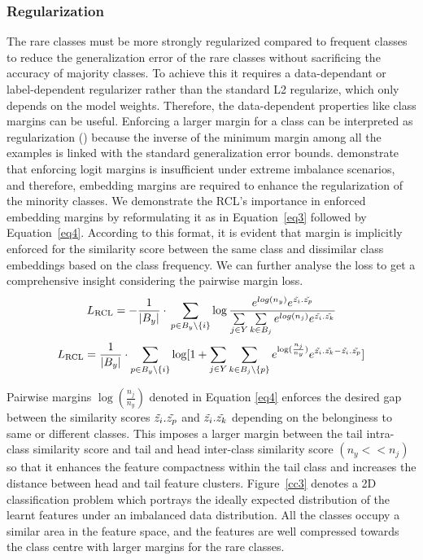 \subsubsection{Regularization}
The rare classes must be more strongly regularized compared to frequent classes to reduce the generalization error of the rare classes without sacrificing the accuracy of majority classes. To achieve this it requires a data-dependant or label-dependent regularizer rather than the standard L2 regularize, which only depends on the model weights. Therefore, the data-dependent properties like class margins can be useful.  Enforcing a larger margin for a class can be interpreted as regularization (\cite{cao2019learning}) because the inverse of the minimum margin among all the examples is linked with the standard generalization error bounds. \cite{elm} demonstrate that enforcing logit margins is insufficient under extreme imbalance scenarios, and therefore, embedding margins are required to enhance the regularization of the minority classes. We demonstrate the RCL's importance in enforced embedding margins by reformulating it as in Equation~\ref{eq3} followed by Equation~\ref{eq4}. According to this format, it is evident that margin is implicitly enforced for the similarity score between the same class and dissimilar class embeddings based on the class frequency. We can further analyse the loss to get a comprehensive insight considering the pairwise margin loss.
\begin{equation}
L_{\text{RCL}}=-\frac{1}{|B_y|} \cdot \\ \sum\limits_{p\in {B_y \text{\textbackslash} \{i\}} }\log \frac{e^{log(n_y)}e^{\Tilde{z_i}.\Tilde{z_p}}}{\sum\limits_{j\in Y} \sum\limits_{k \in B_j } e^{log(n_j)}e^{\Tilde{z_i}.\Tilde{z_k}}}
\label{eq3}
\end{equation}
\begin{equation}
L_{\text{RCL}}=\frac{1}{|B_y|} \cdot  \sum\limits_{p\in {B_y \text{\textbackslash}\{i\}} }\log[1+ \sum\limits_{j\in Y} \sum\limits_{k \in B_j \text{\textbackslash} \{p\}}e^{\log (\frac{n_j}{n_y})}e^{\Tilde{z_i}.\Tilde{z_k} -\Tilde{z_i}.\Tilde{z_p}}]
\label{eq4}
\end{equation}

Pairwise margins $\log(\frac{n_j}{n_y})$ denoted in Equation \ref{eq4} enforces the desired gap between the similarity scores $\Tilde{z_i}.\Tilde{z_p}$ and $\Tilde{z_i}.\Tilde{z_k}$ depending on the belonginess to same or different classes. This imposes a larger margin between the tail intra-class similarity score and tail and head inter-class similarity score $(n_y<<n_j)$  so that it enhances the feature compactness within the tail class and increases the distance between head and tail feature clusters.  
Figure~\ref{cc3} denotes a 2D classification problem which portrays the ideally expected distribution of the learnt features under an imbalanced data distribution. All the classes occupy a similar area in the feature space, and the features are well compressed towards the class centre with larger margins for the rare classes.

